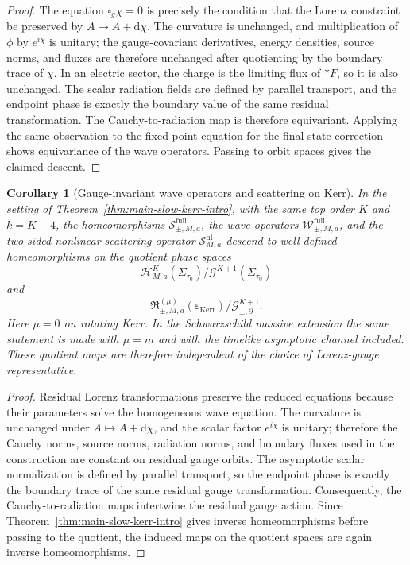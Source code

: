 \documentclass[11pt]{article}
\numberwithin{equation}{section}
\theoremstyle{plain}
\newtheorem{corollary}[theorem]{Corollary}
\theoremstyle{definition}
\theoremstyle{remark}
\newcommand{\dd}{\mathrm{d}}
\begin{document}
\begin{proof}
The equation \(\square_g\chi=0\) is precisely the condition that the Lorenz constraint be preserved by \(A\mapsto A+\dd\chi\).  The curvature is unchanged, and multiplication of \(\phi\) by \(e^{i\chi}\) is unitary; the gauge-covariant derivatives, energy densities, source norms, and fluxes are therefore unchanged after quotienting by the boundary trace of \(\chi\).  In an electric sector, the charge is the limiting flux of \(*F\), so it is also unchanged.  The scalar radiation fields are defined by parallel transport, and the endpoint phase is exactly the boundary value of the same residual transformation.  The Cauchy-to-radiation map is therefore equivariant.  Applying the same observation to the fixed-point equation for the final-state correction shows equivariance of the wave operators.  Passing to orbit spaces gives the claimed descent.
\end{proof}

\begin{corollary}[Gauge-invariant wave operators and scattering on Kerr]\label{cor:gauge-invariant}
In the setting of Theorem~\ref{thm:main-slow-kerr-intro}, with the same top order $K$ and $k=K-4$, the homeomorphisms $\mathscr S_{\pm,M,a}^{\mathrm{full}}$, the wave operators $\mathscr W_{\pm,M,a}^{\mathrm{full}}$, and the two-sided nonlinear scattering operator $\mathscr S_{M,a}^{\mathrm{nl}}$ descend to well-defined homeomorphisms on the quotient phase spaces
\begin{equation}
\mathcal H^{K}_{M,a}(\Sigma_{\tau_{0}})/\mathcal G^{K+1}(\Sigma_{\tau_{0}})
\end{equation}
and
\begin{equation}
\mathfrak R_{\pm,M,a}^{(\mu)}(\varepsilon_{\mathrm{Kerr}})/\mathcal G_{\pm,\partial}^{K+1}.
\end{equation}
Here $\mu=0$ on rotating Kerr.  In the Schwarzschild massive extension the same statement is made with $\mu=m$ and with the timelike asymptotic channel included.  These quotient maps are therefore independent of the choice of Lorenz-gauge representative.
\end{corollary}

\begin{proof}
Residual Lorenz transformations preserve the reduced equations because their parameters solve the homogeneous wave equation.  The curvature is unchanged under $A\mapsto A+\dd\chi$, and the scalar factor $e^{i\chi}$ is unitary; therefore the Cauchy norms, source norms, radiation norms, and boundary fluxes used in the construction are constant on residual gauge orbits.  The asymptotic scalar normalization is defined by parallel transport, so the endpoint phase is exactly the boundary trace of the same residual gauge transformation.  Consequently, the Cauchy-to-radiation maps intertwine the residual gauge action.  Since Theorem~\ref{thm:main-slow-kerr-intro} gives inverse homeomorphisms before passing to the quotient, the induced maps on the quotient spaces are again inverse homeomorphisms.
\end{proof}
\end{document}
